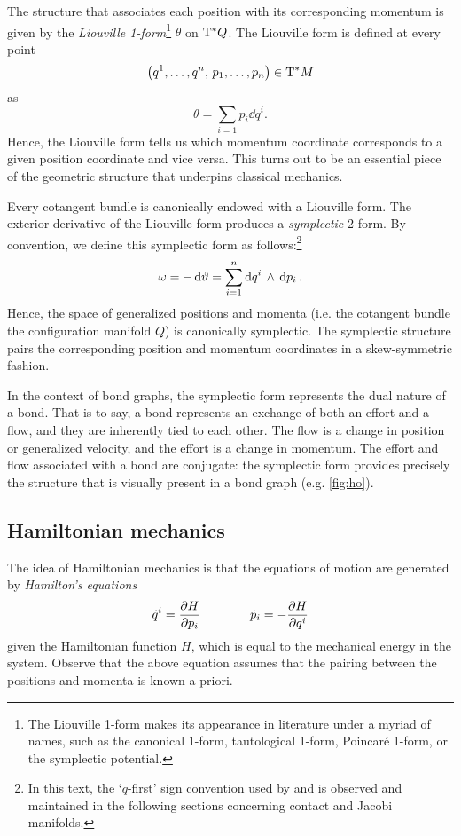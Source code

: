 The structure that associates each position with its corresponding momentum is given by the \emph{Liouville 1-form}\footnote
{
    The Liouville 1-form makes its appearance in literature under a myriad of names, such as the canonical 1-form, tautological 1-form, Poincaré 1-form, or the symplectic potential.
}
\(\theta\) on \(\mathrm{T}^*Q\). The Liouville form is defined at every point 
\[ \qty(q^1, \ldots, q^n,\, p_1, \ldots, p_n) \in \mathrm{T}^*M \] 
as
\begin{equation}
    \theta = \sum_{i = 1} p_i\dd{q^i}.
\end{equation}
Hence, the Liouville form tells us which momentum coordinate corresponds to a given position coordinate and vice versa. This turns out to be an essential piece of the geometric structure that underpins classical mechanics.

Every cotangent bundle is canonically endowed with a Liouville form. The exterior derivative of the Liouville form produces a \emph{symplectic} 2-form. By convention, we define this symplectic form as follows:\footnote
{
    In this text, the `\(q\)-first' sign convention used by \citet{Abraham1978} and \citet{Cannas2001} is observed and maintained in the following sections concerning contact and Jacobi manifolds.
}
\begin{equation}
     \omega = -\dd{\vartheta} = \sum_{i = 1}^n  \dd{q^i}\,\wedge\,\dd{p_i} .
\end{equation}
Hence, the space of generalized positions and momenta (i.e. the cotangent bundle the configuration manifold \(Q\)) is canonically symplectic. The symplectic structure pairs the corresponding position and momentum coordinates in a skew-symmetric fashion.

In the context of bond graphs, the symplectic form represents the dual nature of a bond. That is to say, a bond represents an exchange of both an effort and a flow, and they are inherently tied to each other. The flow is a change in position or generalized velocity, and the effort is a change in momentum. The effort and flow associated with a bond are conjugate: the symplectic form provides precisely the structure that is visually present in a bond graph (e.g. \cref{fig:ho}).

\subsection{Hamiltonian mechanics}
The idea of Hamiltonian mechanics is that the equations of motion are generated by \emph{Hamilton's equations}
\begin{equation}
     \dot{q}^i = \pdv{H}{p_i} \qquad\qquad \dot{p}_i = -\pdv{H}{q^i}
\end{equation}
given the Hamiltonian function \(H\), which is equal to the mechanical energy in the system. Observe that the above equation assumes that the pairing between the positions and momenta is known a priori. 


